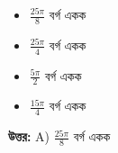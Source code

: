 \documentclass[12pt, a4paper]{article}
\begin{document}
\vspace{1em}
\begin{itemize}[label={}, leftmargin=1cm, itemsep=0.5em]
    \item[\textbf{A)}] $\frac{25\pi}{8}$ বর্গ একক
    \item[\textbf{B)}] $\frac{25\pi}{4}$ বর্গ একক
    \item[\textbf{C)}] $\frac{5\pi}{2}$ বর্গ একক
    \item[\textbf{D)}] $\frac{15\pi}{4}$ বর্গ একক
\end{itemize}

\vspace{0.5em}
\begin{tcolorbox}[answerbox]
    \textbf{\color{success} উত্তর:} A) $\frac{25\pi}{8}$ বর্গ একক
\end{tcolorbox}
\vspace{1em}
\end{document}
